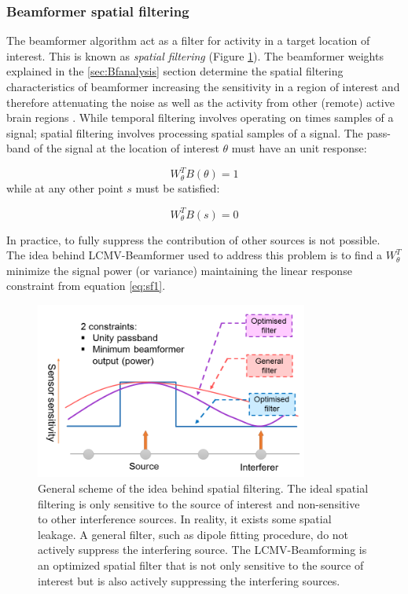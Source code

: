        \subsubsection{Beamformer spatial filtering}
		\label{sec:BfSpatialFilter}

The beamformer algorithm act as a filter for activity in a target location of interest. This is known as \emph{spatial filtering} (Figure \ref{fig:spatialFilter}). The beamformer weights explained in the \ref{sec:Bfanalysis} section determine the spatial filtering characteristics of beamformer increasing the sensitivity in a region of interest and therefore attenuating the noise as well as the activity from other (remote) active brain regions \citep{Mosher2003}. While temporal filtering involves operating on times samples of a signal; spatial filtering involves processing spatial samples of a signal. The pass-band of the signal at the location of interest $\theta$ must have an unit response: 

\begin{equation}
\label{eq:sf1}
W_{\theta}^T B(\theta) = 1
\end{equation}
while at any other point $s$ must be satisfied:

\begin{equation}
W_{\theta}^T B(s) = 0
\end{equation}

In practice, to fully suppress the contribution of other sources is not possible. The idea behind LCMV-Beamformer\citep{vanVeen1997} used to address this problem is to find a $W_{\theta}^T$ minimize the signal power (or variance) maintaining the linear response constraint from equation \ref{eq:sf1}.

\begin{figure}
\centering
\includegraphics[width=0.8\textwidth]{Images/spatialfilter.png}
\caption{General scheme of the idea behind spatial filtering. The ideal spatial filtering is only sensitive to the source of interest and non-sensitive to other interference sources. In reality, it exists some spatial leakage. A general filter, such as dipole fitting procedure, do not actively suppress the interfering source. The LCMV-Beamforming is an optimized spatial filter that is not only sensitive to the source of interest but is also actively suppressing the interfering sources.}
\label{fig:spatialFilter}
\end{figure}      

